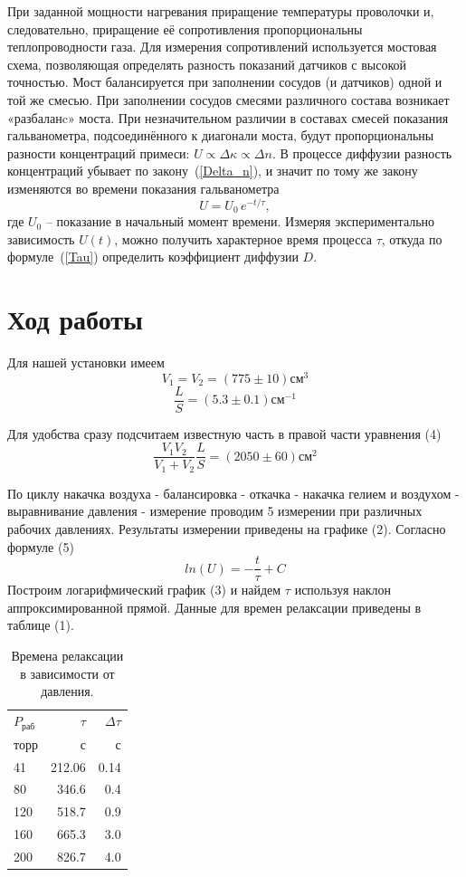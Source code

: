 \documentclass{article}
\begin{document}
    При заданной мощности нагревания приращение температуры  проволочки и, следовательно, приращение её сопротивления пропорциональны теплопроводности газа. Для измерения сопротивлений используется мостовая схема, позволяющая определять разность показаний датчиков с высокой точностью. Мост балансируется при заполнении сосудов (и датчиков) одной и той же смесью. При заполнении сосудов смесями различного состава возникает «разбаланc» моста. При незначительном различии в составах смесей показания гальванометра, подсоединённого к диагонали моста, будут пропорциональны разности концентраций примеси: $U\propto\Delta \kappa \propto \Delta n$. В процессе диффузии разность концентраций убывает по закону~(\ref{Delta_n}), и значит по тому же закону изменяются во времени показания гальванометра
    \begin{equation}
        U = U_0 \, e^{-t / \tau},
    \end{equation}
    где $U_0$ -- показание в начальный момент времени. Измеряя экспериментально зависимость $U(t)$, можно получить характерное время процесса $\tau$, откуда по формуле~(\ref{Tau}) определить коэффициент диффузии $D$.

    \section{Ход работы}
    Для нашей установки имеем
    \[V_1=V_2=(775 \pm 10)см^3\]
    \[\frac{L}{S} = (5.3 \pm 0.1)см^{-1}\]

    Для удобства сразу подсчитаем известную часть в правой части уравнения (4)
    \[\frac{V_1V_2}{V_1 + V_2} \frac{L}{S} = (2050 \pm 60)см^2\]

    По циклу накачка воздуха - балансировка - откачка - накачка гелием и воздухом - выравнивание давления - измерение проводим 5 измерении при различных рабочих давлениях. Результаты измерении приведены на графике (2). Согласно формуле (5)
    \[ln(U) = -\frac{t}{\tau} + C\]
    Построим логарифмический график (3) и найдем $\tau$ используя наклон аппроксимированной прямой. Данные для времен релаксации приведены в таблице (1).


    \begin{table}[h!]
        \vspace{5pt}
        \begin{center}
        \begin{tabular}{|l|rr|}
        \hline
        $P_{раб}$ & $\tau$ & $\Delta \tau$ \\
        торр & с & с\\
        \hline
        41 & 212.06 & 0.14 \\
        80 & 346.6 & 0.4 \\
        120 & 518.7 & 0.9 \\
        160 & 665.3 & 3.0 \\
        200 & 826.7 & 4.0 \\
        \hline
        \end{tabular}

        \caption{Времена релаксации в зависимости от давления.}
        \label{data}
        \end{center}
    \end{table}
\end{document}
